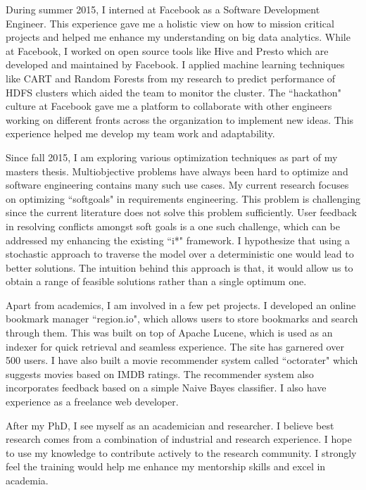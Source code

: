 \documentclass{article}
\begin{document}
\bigskip
During summer 2015, I interned at Facebook as a Software Development Engineer. This experience gave me a holistic view on how to mission critical projects and helped me enhance my understanding on big data analytics. While at Facebook, I worked on open source tools like Hive and Presto which are developed and maintained by Facebook. I applied machine learning techniques like CART and Random Forests from my research to predict performance of HDFS clusters which aided the team to monitor the cluster. The ``hackathon" culture at Facebook gave me a platform to collaborate with other engineers working on different fronts across the organization to implement new ideas. This experience helped me develop my team work and adaptability. 

\bigskip
Since fall 2015, I am exploring various optimization techniques as part of my masters thesis. Multiobjective problems have always been hard to optimize and software engineering contains many such use cases. My current research focuses on optimizing ``softgoals" in requirements engineering. This problem is challenging since the current literature does not solve this problem sufficiently. User feedback in resolving conflicts amongst soft goals is a one such challenge, which can be addressed my enhancing the existing ``i*" framework. I hypothesize that using a stochastic approach to traverse the model over a deterministic one would lead to better solutions. The intuition behind this approach is that, it would allow us to obtain a range of feasible solutions rather than a single optimum one.

\bigskip
Apart from academics, I am involved in a few pet projects. I developed an online bookmark manager ``region.io", which allows users to store bookmarks and search through them. This was built on top of Apache Lucene, which is used as an indexer for quick retrieval and seamless experience. The site has garnered over 500 users. I have also built a movie recommender system called ``octorater" which suggests movies based on IMDB ratings. The recommender system also incorporates feedback based on a simple Naive Bayes classifier. I also have experience as a freelance web developer.

\bigskip
After my PhD, I see myself as an academician and researcher. I believe best research comes from a combination of industrial and research experience. I hope to use my knowledge to contribute actively to the research community. I strongly feel the training would help me enhance my mentorship skills and excel in academia.
\end{document}
